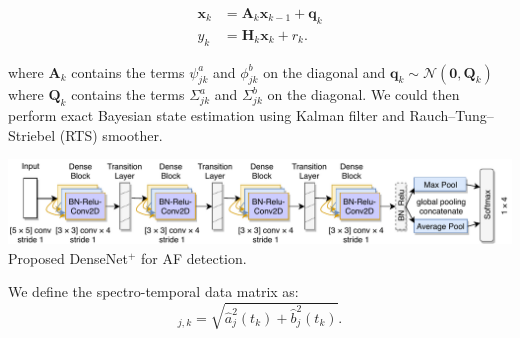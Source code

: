 \documentclass[portrait,a0,final]{a0poster} %
\newcommand{\figurespace}{10mm} %
\begin{document}
\begin{minipage}{0.98\linewidth}
\begin{minipage}[t]{0.47\linewidth}
\begin{equation}
\begin{split}
\mathbf{x}_k &= \mathbf{A}_{k} \mathbf{x}_{k-1} + \mathbf{q}_{k} \\
y_k &= \mathbf{H}_k \mathbf{x}_k + r_k.
\end{split}
\label{eq:dynmodel}
\end{equation}

where $\mathbf{A}_k$ contains the terms $\psi^a_{jk}$ and $\phi^b_{jk}$ on the diagonal and $ \mathbf{q}_{k} \sim \mathcal{N}(\mathbf{0},\mathbf{Q}_k)$ where $\mathbf{Q}_k$ contains the terms $\Sigma^a_{jk}$ and $\Sigma^b_{jk}$ on the diagonal. We could then perform exact Bayesian state estimation using Kalman filter and Rauch–Tung–Striebel (RTS) smoother. 

\vspace{\figurespace}
\includegraphics[scale=1.8]{figures/densely_banner}
\large
\centering
Proposed DenseNet$^+$ for AF detection.

\end{minipage} %
\hspace{0.03\linewidth} %
\begin{minipage}[t]{0.47\linewidth}
\Large

We define the spectro-temporal data matrix as:
\begin{equation}
[\mathbf{S}]_{j,k} = \sqrt{\hat{a}_{j}^2(t_k) + \hat{b}_{j}^2(t_k)}.
\label{eq:power_density}
\end{equation}


\end{minipage}
\end{minipage}
\end{document}
